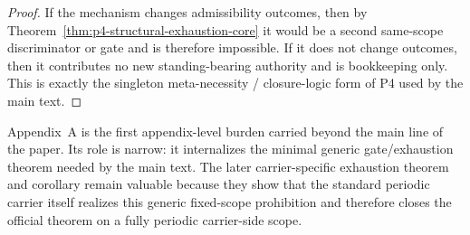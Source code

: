 \begin{proof}
If the mechanism changes admissibility outcomes, then by Theorem~\ref{thm:p4-structural-exhaustion-core} it would be a second same-scope discriminator or gate and is therefore impossible. If it does not change outcomes, then it contributes no new standing-bearing authority and is bookkeeping only. This is exactly the singleton meta-necessity / closure-logic form of P4 used by the main text.
\end{proof}

\begin{remark}
Appendix~A is the first appendix-level burden carried beyond the main line of the paper. Its role is narrow: it internalizes the minimal generic gate/exhaustion theorem needed by the main text. The later carrier-specific exhaustion theorem and corollary remain valuable because they show that the standard periodic carrier itself realizes this generic fixed-scope prohibition and therefore closes the official theorem on a fully periodic carrier-side scope.
\end{remark}

